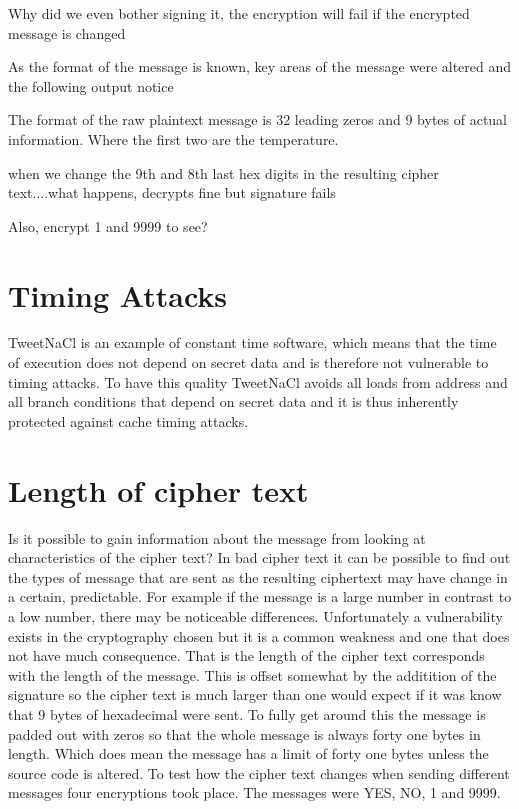 Why did we even bother signing it, the encryption will fail if the encrypted message is changed

As the format of the message is known, key areas of the message were altered and the following output notice

The format of the raw plaintext message is 32 leading zeros and 9 bytes of actual information. Where the first two are the temperature. 

when we change the 9th and 8th last hex digits in the resulting cipher text....what happens, decrypts fine but signature fails


Also, encrypt 1 and 9999 to see?


\section{Timing Attacks}

TweetNaCl is an example of constant time software, which means that the time of execution does not depend on secret data and is therefore not vulnerable to timing attacks. To have this quality TweetNaCl avoids all loads from address and all branch conditions that depend on secret data and it is thus inherently protected against cache timing attacks. 

\section{Length of cipher text}

Is it possible to gain information about the message from looking at characteristics of the cipher text? In bad cipher text it can be possible to find out the types of message that are sent as the resulting ciphertext may have change in a certain, predictable. For example if the message is a large number in contrast to a low number, there may be noticeable differences. Unfortunately a vulnerability exists in the cryptography chosen but it is a common weakness and one that does not have much consequence. That is the length of the cipher text corresponds with the length of the message. This is offset somewhat by the additition of the signature so the cipher text is much larger than one would expect if it was know that 9 bytes of hexadecimal were sent. To fully get around this the message is padded out with zeros so that the whole message is always forty one bytes in length. Which does mean the message has a limit of forty one bytes unless the source code is altered. To test how the cipher text changes when sending different messages four encryptions took place. The messages were YES, NO, 1 and 9999. 

